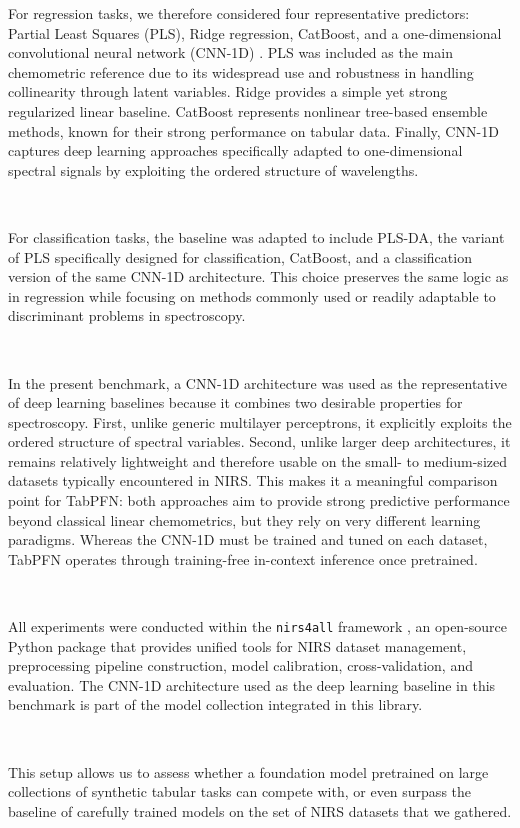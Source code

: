 \documentclass{article}
\begin{document}
For regression tasks, we therefore considered four representative predictors: Partial Least Squares (PLS), Ridge regression, CatBoost, and a one-dimensional convolutional neural network (CNN-1D) \cite{nicon_yam}. PLS was included as the main chemometric reference due to its widespread use and robustness in handling collinearity through latent variables. Ridge provides a simple yet strong regularized linear baseline. CatBoost represents nonlinear tree-based ensemble methods, known for their strong performance on tabular data. Finally, CNN-1D captures deep learning approaches specifically adapted to one-dimensional spectral signals by exploiting the ordered structure of wavelengths.

~

For classification tasks, the baseline was adapted to include PLS-DA, the variant of PLS specifically designed for classification, CatBoost, and a classification version of the same CNN-1D architecture. This choice preserves the same logic as in regression while focusing on methods commonly used or readily adaptable to discriminant problems in spectroscopy.

~

In the present benchmark, a CNN-1D architecture was used as the representative of deep learning baselines because it combines two desirable properties for spectroscopy. First, unlike generic multilayer perceptrons, it explicitly exploits the ordered structure of spectral variables. Second, unlike larger deep architectures, it remains relatively lightweight and therefore usable on the small- to medium-sized datasets typically encountered in NIRS. This makes it a meaningful comparison point for TabPFN: both approaches aim to provide strong predictive performance beyond classical linear chemometrics, but they rely on very different learning paradigms. Whereas the CNN-1D must be trained and tuned on each dataset, TabPFN operates through training-free in-context inference once pretrained.

~

All experiments were conducted within the \texttt{nirs4all} framework \cite{beurier2025nirs4all}, an open-source Python package that provides unified tools for NIRS dataset management, preprocessing pipeline construction, model calibration, cross-validation, and evaluation. The CNN-1D architecture used as the deep learning baseline in this benchmark is part of the model collection integrated in this library.

~

This setup allows us to assess whether a foundation model pretrained on large collections of synthetic tabular tasks can compete with, or even surpass the baseline of carefully trained models on the set of NIRS datasets that we gathered.
\end{document}
